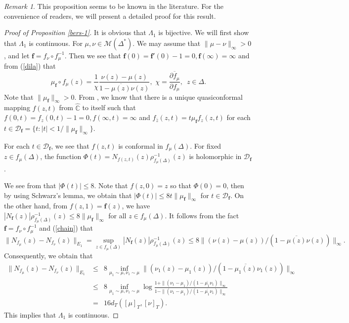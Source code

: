 \documentclass[11pt]{amsart}
\theoremstyle{remark}
\newtheorem{remark}[theorem]{Remark}
\theoremstyle{claim}
\theoremstyle{definition}
\theoremstyle{problem}
\theoremstyle{conjecture}
\theoremstyle{question}
\numberwithin{equation}{section}
\begin{document}
\begin{remark}
This proposition seems to be known in the literature. For the convenience of readers, we will present a detailed proof for this result. 
\end{remark}

\begin{proof}[Proof of Proposition \ref{bers-1}]
It is obvious that $\Lambda_1$ is bijective. We will first show that $\Lambda_1$ is continuous. For $\mu, \nu \in \mathcal{M}(\Delta^*)$. We may assume that $\|\mu-\nu\|_{\infty}>0$, and let $\mathbf{f}=f_{\nu}\circ f_{\mu}^{-1}$.  Then we see that $\mathbf{f}(0)=\mathbf{f}'(0)-1=0, \mathbf{f}(\infty)=\infty$ and from (\ref{dila}) that 
\begin{equation}
\mu_{\mathbf{f}}\circ f_{\mu}(z) =\frac{1}{\chi}\frac{\nu(z)-\mu(z)}{1-\overline{\mu(z)}\nu(z)},\,\, \chi=\frac{\overline{\partial f_{\mu}}}{\partial f_{\mu}}, \,\,\, z\in \Delta.\nonumber
\end{equation}
Note that $\|\mu_{\mathbf{f}}\|_{\infty}>0$. From \cite{AB}, we know that there is a unique quasiconformal mapping $f(z, t)$ from $\widehat{\mathbb{C}}$ to itself such that $f(0, t)=f_{z}(0, t)-1=0,f(\infty, t)=\infty$ and 
$f_{\bar{z}}(z, t)=t\mu_{\mathbf{f}}f_z(z, t)$
for each $t \in \mathcal{D}_{\mathbf{f}}=\{t: |t|<1/\|\mu_{\mathbf{f}}\|_{\infty}\}.$ 

For each $t\in \mathcal{D}_{\mathbf{f}}$, we see that $f(z, t)$ is conformal in $f_{\mu}(\Delta)$.  For fixed $z\in f_{\mu}(\Delta)$, the function 
$\Phi(t)=N_{f(z, t)}(z) \rho_{f_{\mu}(\Delta)}^{-1}(z)$ is holomorphic in $\mathcal{D}_{\mathbf{f}}$. 

We see from \cite{O} that $|\Phi(t)|\leq 8$. Note that $f(z, 0)=z$ so that $\Phi(0)=0$, then by using Schwarz's lemma, we obtain that $|\Phi(t)|\leq 8t\|\mu_{\mathbf{f}}\|_{\infty}$ for $t\in \mathcal{D}_{\mathbf{f}}$. On the other hand, from $f(z, 1)=\mathbf{f}(z)$, we have
$|N_{\mathbf{f}}(z)|\rho_{f_{\mu}(\Delta)}^{-1}(z) \leq 8 \|\mu_{\mathbf{f}}\|_{\infty}$ for all $z\in f_{\mu}(\Delta)$. 
It follows from the fact $\mathbf{f}=f_{\nu}\circ f_{\mu}^{-1}$ and (\ref{chain}) that 
$$\|N_{f_{\mu}}(z)-N_{f_{\nu}}(z)\|_{E_1}=\sup\limits_{z\in f_{\mu}(\Delta)}|N_{\mathbf{f}}(z)|\rho_{f_{\mu}(\Delta)}^{-1}(z) \leq 8 \|(\nu(z)-\mu(z))/(1-\overline{\mu(z)}\nu(z))\|_{\infty}.$$
Consequently, we obtain that
\begin{eqnarray}\|N_{f_{\mu}}(z)-N_{f_{\nu}}(z)\|_{E_1} &\leq & 8 \inf\limits_{\mu_1 \sim \mu, \nu_1 \sim \mu} \|(\nu_1(z)-\mu_1(z))/(1-\overline{\mu_1(z)}\nu_1(z))\|_{\infty}\nonumber 
\\ &\leq &  8 \inf\limits_{\mu_1 \sim \mu, \nu_1 \sim \mu} \log \frac{1+\|(\nu_1-\mu_1)/(1-\overline{\mu_1}\nu_1)\|_{\infty}}{1-\|(\nu_1-\mu_1)/(1-\overline{\mu_1}\nu_1)\|_{\infty}} \nonumber
\\ &=& 16d_{T}([\mu]_T, [\nu]_T). \nonumber
\end{eqnarray}
This implies that $\Lambda_1$ is continuous. 


\end{proof}
\end{document}
